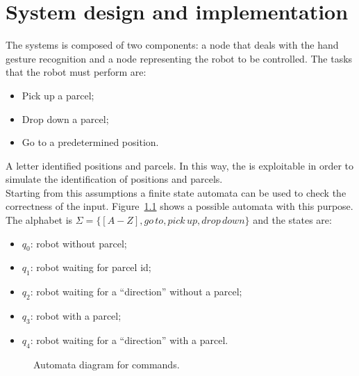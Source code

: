\documentclass[../thesis.tex]{subfiles}
\begin{document}
\chapter{System design and implementation}\label{cap:system_design_and_implementation}
The systems is composed of two components: a node that deals with the hand gesture recognition and a node representing the robot to be controlled. The tasks that the robot must perform are:
\begin{itemize}
    \item Pick up a parcel;
    \item Drop down a parcel;
    \item Go to a predetermined position.
\end{itemize}
A letter identified positions and parcels. In this way, the  is exploitable in order to simulate the identification of positions and parcels.\\
Starting from this assumptions a finite state automata can be used to check the correctness of the input. Figure~\ref{fig:automata_for_commands} shows a possible automata with this purpose. The alphabet is $\Sigma = \{[A-Z], go\, to, pick\, up, drop\, down\}$ and the states are:
\begin{itemize}
    \item \textbf{$q_0$}: robot without parcel; 
    \item \textbf{$q_1$}: robot waiting for parcel id; 
    \item \textbf{$q_2$}: robot waiting for a ``direction'' without a parcel;
    \item \textbf{$q_3$}: robot with a parcel;
    \item \textbf{$q_4$}: robot waiting for a ``direction'' with a parcel.
\end{itemize}

\begin{figure}[h]
    \centering
    \caption{Automata diagram for commands.}
    \label{fig:automata_for_commands}
\end{figure}
\end{document}
